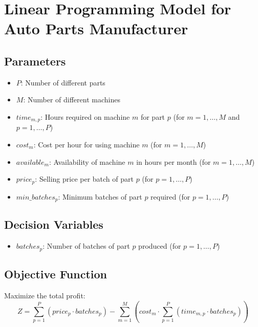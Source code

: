 \documentclass{article}
\begin{document}
\section*{Linear Programming Model for Auto Parts Manufacturer}

\subsection*{Parameters}
\begin{itemize}
    \item $P$: Number of different parts
    \item $M$: Number of different machines
    \item $time_{m,p}$: Hours required on machine $m$ for part $p$ (for $m = 1, \ldots, M$ and $p = 1, \ldots, P$)
    \item $cost_{m}$: Cost per hour for using machine $m$ (for $m = 1, \ldots, M$)
    \item $available_{m}$: Availability of machine $m$ in hours per month (for $m = 1, \ldots, M$)
    \item $price_{p}$: Selling price per batch of part $p$ (for $p = 1, \ldots, P$)
    \item $min\_batches_{p}$: Minimum batches of part $p$ required (for $p = 1, \ldots, P$)
\end{itemize}

\subsection*{Decision Variables}
\begin{itemize}
    \item $batches_{p}$: Number of batches of part $p$ produced (for $p = 1, \ldots, P$)
\end{itemize}

\subsection*{Objective Function}
Maximize the total profit:
\[
Z = \sum_{p=1}^{P} (price_{p} \cdot batches_{p}) - \sum_{m=1}^{M} (cost_{m} \cdot \sum_{p=1}^{P} (time_{m,p} \cdot batches_{p}))
\]
\end{document}
